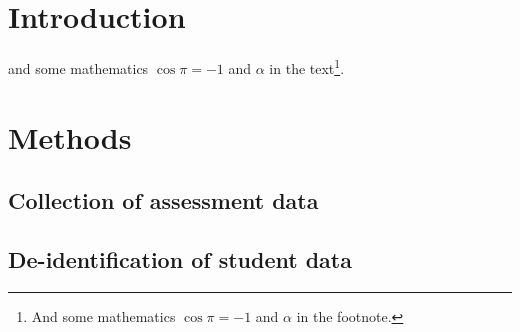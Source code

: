 \documentclass[fleqn,10pt]{SelfArx}\usepackage[]{graphicx}\usepackage[]{color}
\affiliation{\textsuperscript{1}\textit{General Education Coordinator, Ferris State University}} %
\begin{document}
\flushbottom %

\maketitle %

\tableofcontents %

{
	\fancyhf{}
}
\thispagestyle{firststyle}


\section{Introduction} %




\lipsum[1] %
 and some mathematics $\cos\pi=-1$ and $\alpha$ in the text\footnote{And some mathematics $\cos\pi=-1$ and $\alpha$ in the footnote.}.


\section{Methods}

\subsection{Collection of assessment data}
\lipsum[1]
\subsection{De-identification of student data}
\lipsum[1]
\end{document}
